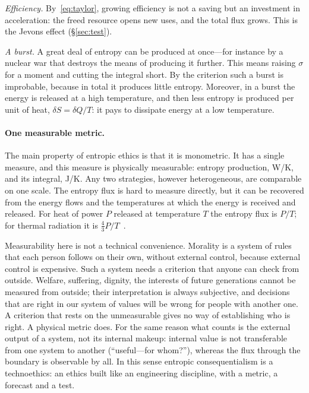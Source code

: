 \documentclass[11pt,a4paper]{article}
\newcommand{\Sref}[1]{\hyperref[#1]{\S\ref{#1}}}
\begin{document}
\emph{Efficiency.} By~\eqref{eq:taylor}, growing efficiency is not a saving but an investment in acceleration: the freed resource opens new uses, and the total flux grows. This is the Jevons effect (\Sref{sec:test}).

\emph{A burst.} A great deal of entropy can be produced at once---for instance by a nuclear war that destroys the means of producing it further. This means raising $\sigma$ for a moment and cutting the integral short. By the criterion such a burst is improbable, because in total it produces little entropy. Moreover, in a burst the energy is released at a high temperature, and then less entropy is produced per unit of heat, $\delta S=\delta Q/T$: it pays to dissipate energy at a low temperature.

\paragraph{One measurable metric.}
The main property of entropic ethics is that it is monometric. It has a single measure, and this measure is physically measurable: entropy production, W/K, and its integral, J/K. Any two strategies, however heterogeneous, are comparable on one scale. The entropy flux is hard to measure directly, but it can be recovered from the energy flows and the temperatures at which the energy is received and released. For heat of power $P$ released at temperature $T$ the entropy flux is $P/T$; for thermal radiation it is $\tfrac43P/T$~\cite{wu2010}.

Measurability here is not a technical convenience. Morality is a system of rules that each person follows on their own, without external control, because external control is expensive. Such a system needs a criterion that anyone can check from outside. Welfare, suffering, dignity, the interests of future generations cannot be measured from outside; their interpretation is always subjective, and decisions that are right in our system of values will be wrong for people with another one. A criterion that rests on the unmeasurable gives no way of establishing who is right. A physical metric does. For the same reason what counts is the external output of a system, not its internal makeup: internal value is not transferable from one system to another (``useful---for whom?''), whereas the flux through the boundary is observable by all. In this sense entropic consequentialism is a technoethics: an ethics built like an engineering discipline, with a metric, a forecast and a test.
\end{document}
